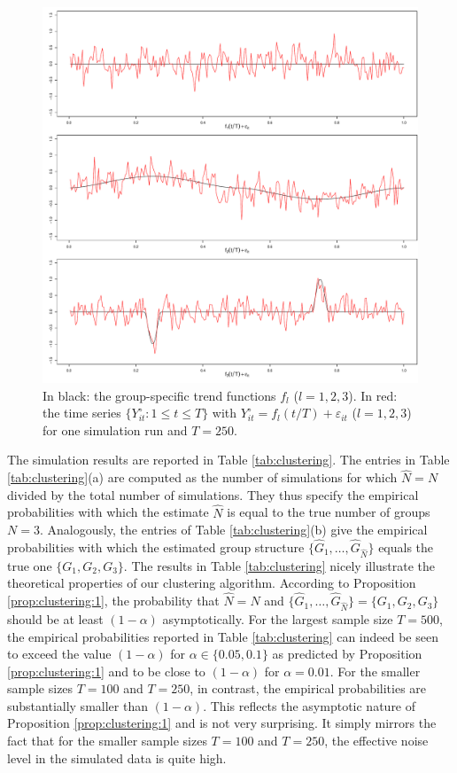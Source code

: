 \documentclass[12pt]{article}
\begin{document}
\begin{figure}[t!]
\includegraphics[width=\textwidth]{../output/clustering_functions.pdf}
\caption{In black: the group-specific trend functions $f_l$ ($l=1,2,3$). In red: the time series $\{Y_{it}^\circ : 1 \le t \le T \}$ with $Y_{it}^\circ = f_l(t/T) + \varepsilon_{it}$ ($l=1,2,3$) for one simulation run and $T=250$.}\label{fig:clustering_fcts}
\end{figure}


The simulation results are reported in Table \ref{tab:clustering}. The entries in Table \ref{tab:clustering}(a) are computed as the number of simulations for which $\widehat{N} = N$ divided by the total number of simulations. They thus specify the empirical probabilities with which the estimate $\widehat{N}$ is equal to the true number of groups $N = 3$. Analogously, the entries of Table \ref{tab:clustering}(b) give the empirical probabilities with which the estimated group structure $\{ \widehat{G}_1,\ldots,\widehat{G}_{\widehat{N}}\}$ equals the true one $\{G_1,G_2,G_3\}$. The results in Table \ref{tab:clustering} nicely illustrate the theoretical properties of our clustering algorithm. According to Proposition \ref{prop:clustering:1}, the probability that $\widehat{N} = N$ and $\{ \widehat{G}_1,\ldots,\widehat{G}_{\widehat{N}}\} = \{G_1,G_2,G_3\}$ should be at least $(1-\alpha)$ asymptotically. For the largest sample size $T = 500$, the empirical probabilities reported in Table \ref{tab:clustering} can indeed be seen to exceed the value $(1-\alpha)$ for $\alpha \in \{0.05,0.1\}$ as predicted by Proposition \ref{prop:clustering:1} and to be close to $(1-\alpha)$ for $\alpha=0.01$. For the smaller sample sizes $T=100$ and $T=250$, in contrast, the empirical probabilities are substantially smaller than $(1-\alpha)$. This reflects the asymptotic nature of Proposition \ref{prop:clustering:1} and is not very surprising. It simply mirrors the fact that for the smaller sample sizes $T=100$ and $T=250$, the effective noise level in the simulated data is quite high.
\end{document}
